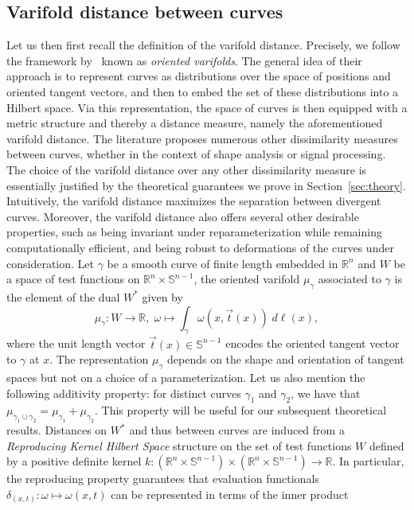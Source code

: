 \documentclass[pdflatex,sn-mathphys-num]{sn-jnl}%
\theoremstyle{thmstyleone}%
\theoremstyle{thmstyletwo}%
\theoremstyle{thmstylethree}%
\newcommand{\bR}{\mathbb R}
\begin{document}
\subsection{Varifold distance between curves}\label{sec:varifold}
Let us then first recall the definition of the varifold distance. Precisely, we follow the framework by~\citeauthor{kaltenmark_general_2017} known as \textit{oriented varifolds}. The general idea of their approach is to represent curves as distributions over the space of positions and oriented tangent vectors, and then to embed the set of these distributions into a Hilbert space. Via this representation, the space of curves is then equipped with a metric structure and thereby a distance measure, namely the aforementioned varifold distance. The literature proposes numerous other dissimilarity measures between curves, whether in the context of shape analysis or signal processing. The choice of the varifold distance over any other dissimilarity measure is essentially justified by the theoretical guarantees we prove in Section~\ref{sec:theory}. Intuitively, the varifold distance maximizes the separation between divergent curves. Moreover, the varifold distance also offers several other desirable properties, such as being invariant under reparameterization while remaining computationally efficient, and being robust to deformations of the curves under consideration. 
\medbreak  
Let $\gamma$ be a smooth curve of finite length embedded in $\mathbb{R}^n$ and $W$ be a space of test functions on $\mathbb{R}^n \times \mathbb{S}^{n-1}$, the oriented varifold $\mu_\gamma$ associated to $\gamma$ is the element of the dual $W^\ast$ given by 
\begin{equation}
    \mu_\gamma: W \to \mathbb{R}, \;\omega \mapsto \int_\gamma \omega(x,\vec{t}(x)) \;d\ell(x),
\end{equation}
where the unit length vector $\vec{t}(x) \in \mathbb{S}^{n-1}$ encodes the oriented tangent vector to $\gamma$ at $x$. The representation $\mu_\gamma$ depends on the shape and orientation of tangent spaces but not on a choice of a parameterization. Let us also mention the following additivity property: for distinct curves $\gamma_1$ and $\gamma_2$, we have that $\mu_{\gamma_1 \cup \gamma_2} = \mu_{\gamma_1} + \mu_{\gamma_2}$. This property will be useful for our subsequent theoretical results.
\medbreak    
Distances on $W^\ast$ and thus between curves are induced from a \textit{Reproducing Kernel Hilbert Space} structure on the set of test functions $W$ defined by a positive definite kernel $k : (\bR^n \times \mathbb{S}^{n-1}) \times (\bR^n \times \mathbb{S}^{n-1}) \to \mathbb{R}$. In particular, the reproducing property guarantees that evaluation functionals $\delta_{(x,t)}: \omega \mapsto \omega(x,t)$ can be represented in terms of the inner product 
\end{document}

